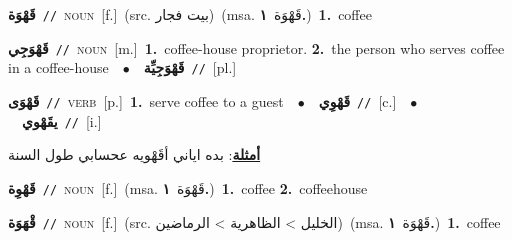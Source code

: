 \documentclass[10pt,a4paper,twoside]{article} %
\begin{document}
\begin{multicols}{2}
{\setlength\topsep{0pt}\textbf{\foreignlanguage{arabic}{قَهْوَة}}\ {\color{gray}\texttt{//}\color{black}}\ \textsc{noun}\ [f.]\ (src. \color{gray}\foreignlanguage{arabic}{بيت فجار}\color{black})\ \color{gray}(msa. \foreignlanguage{arabic}{قَهْوَة}~\foreignlanguage{arabic}{\textbf{١.}})\color{black}\ \textbf{1.}~coffee\ } \vspace{2mm}

{\setlength\topsep{0pt}\textbf{\foreignlanguage{arabic}{قَهْوَجِي}}\ {\color{gray}\texttt{//}\color{black}}\ \textsc{noun}\ [m.]\ \textbf{1.}~coffee-house proprietor.  \textbf{2.}~the person who serves coffee in a coffee-house\ \ $\bullet$\ \ \setlength\topsep{0pt}\textbf{\foreignlanguage{arabic}{قَهْوَجِيِّة}}\ {\color{gray}\texttt{//}\color{black}}\ [pl.]\ } \vspace{2mm}

{\setlength\topsep{0pt}\textbf{\foreignlanguage{arabic}{قَهْوَى}}\ {\color{gray}\texttt{//}\color{black}}\ \textsc{verb}\ [p.]\ \textbf{1.}~serve coffee to a guest\ \ $\bullet$\ \ \setlength\topsep{0pt}\textbf{\foreignlanguage{arabic}{قَهْوِي}}\ {\color{gray}\texttt{//}\color{black}}\ [c.]\ \ $\bullet$\ \ \setlength\topsep{0pt}\textbf{\foreignlanguage{arabic}{يقَهْوي}}\ {\color{gray}\texttt{//}\color{black}}\ [i.]\  \begin{flushright}\color{gray}\foreignlanguage{arabic}{\textbf{\underline{\foreignlanguage{arabic}{أمثلة}}}: بده اياني أقَهْويه عحسابي طول السنة}\end{flushright}\color{black}} \vspace{2mm}

{\setlength\topsep{0pt}\textbf{\foreignlanguage{arabic}{قَهْوِة}}\ {\color{gray}\texttt{//}\color{black}}\ \textsc{noun}\ [f.]\ \color{gray}(msa. \foreignlanguage{arabic}{قَهْوَة}~\foreignlanguage{arabic}{\textbf{١.}})\color{black}\ \textbf{1.}~coffee  \textbf{2.}~coffeehouse\ } \vspace{2mm}

{\setlength\topsep{0pt}\textbf{\foreignlanguage{arabic}{قْهَوَة}}\ {\color{gray}\texttt{//}\color{black}}\ \textsc{noun}\ [f.]\ (src. \color{gray}\foreignlanguage{arabic}{الخليل > الظاهرية > الرماضين}\color{black})\ \color{gray}(msa. \foreignlanguage{arabic}{قَهْوَة}~\foreignlanguage{arabic}{\textbf{١.}})\color{black}\ \textbf{1.}~coffee\ } \vspace{2mm}


\end{multicols}
\end{document}
